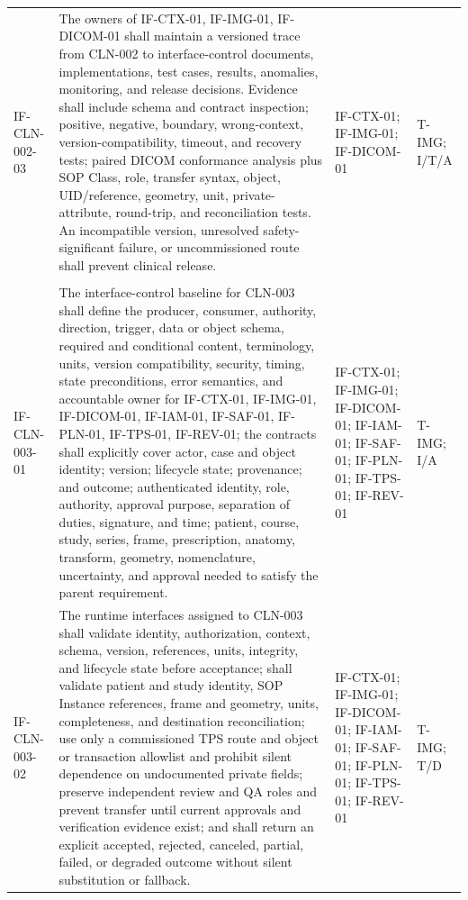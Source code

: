 \documentclass[11pt,letterpaper]{article}
\begin{document}
\begin{scriptsize}
\begin{longtable}{@{}L{0.14\textwidth}L{0.49\textwidth}L{0.19\textwidth}L{0.10\textwidth}@{}}
\addlinespace[2pt]
\mbox{IF-CLN-002-03} & The owners of IF-CTX-01, IF-IMG-01, IF-DICOM-01 shall maintain a versioned trace from CLN-002 to interface-control documents, implementations, test cases, results, anomalies, monitoring, and release decisions. Evidence shall include schema and contract inspection; positive, negative, boundary, wrong-context, version-compatibility, timeout, and recovery tests; paired DICOM conformance analysis plus SOP Class, role, transfer syntax, object, UID\slash\allowbreak{}reference, geometry, unit, private-attribute, round-trip, and reconciliation tests. An incompatible version, unresolved safety-significant failure, or uncommissioned route shall prevent clinical release. & IF-CTX-01; IF-IMG-01; IF-DICOM-01 & T-IMG; I\slash\allowbreak{}T\slash\allowbreak{}A \\
\addlinespace[2pt]
 \\
\addlinespace[2pt]
\mbox{IF-CLN-003-01} & The interface-control baseline for CLN-003 shall define the producer, consumer, authority, direction, trigger, data or object schema, required and conditional content, terminology, units, version compatibility, security, timing, state preconditions, error semantics, and accountable owner for IF-CTX-01, IF-IMG-01, IF-DICOM-01, IF-IAM-01, IF-SAF-01, IF-PLN-01, IF-TPS-01, IF-REV-01; the contracts shall explicitly cover actor, case and object identity; version; lifecycle state; provenance; and outcome; authenticated identity, role, authority, approval purpose, separation of duties, signature, and time; patient, course, study, series, frame, prescription, anatomy, transform, geometry, nomenclature, uncertainty, and approval needed to satisfy the parent requirement. & IF-CTX-01; IF-IMG-01; IF-DICOM-01; IF-IAM-01; IF-SAF-01; IF-PLN-01; IF-TPS-01; IF-REV-01 & T-IMG; I\slash\allowbreak{}A \\
\addlinespace[2pt]
\mbox{IF-CLN-003-02} & The runtime interfaces assigned to CLN-003 shall validate identity, authorization, context, schema, version, references, units, integrity, and lifecycle state before acceptance; shall validate patient and study identity, SOP Instance references, frame and geometry, units, completeness, and destination reconciliation; use only a commissioned TPS route and object or transaction allowlist and prohibit silent dependence on undocumented private fields; preserve independent review and QA roles and prevent transfer until current approvals and verification evidence exist; and shall return an explicit accepted, rejected, canceled, partial, failed, or degraded outcome without silent substitution or fallback. & IF-CTX-01; IF-IMG-01; IF-DICOM-01; IF-IAM-01; IF-SAF-01; IF-PLN-01; IF-TPS-01; IF-REV-01 & T-IMG; T\slash\allowbreak{}D \\

\end{longtable}
\end{scriptsize}
\end{document}

